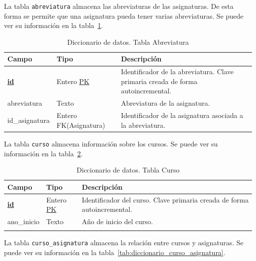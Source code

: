 La tabla \texttt{abreviatura} almacena las abreviaturas de las asignaturas. 
De esta forma se permite que una asignatura pueda tener varias abreviaturas.
Se puede ver su información en la tabla~\ref{tab:diccionario_abreviatura}.

\begin{table}
  \centering 
  \begin{tabular}{l p{} p{}}
    \toprule
    \textbf{Campo} & \textbf{Tipo} & \textbf{Descripción}\\
    \midrule
    \textbf{\underline{id}} & Entero \underline{PK} & Identificador de la abreviatura. Clave primaria creada de forma autoincremental. \\ \addlinespace
    abreviatura & Texto & Abreviatura de la asignatura. \\ \addlinespace
    id\_asignatura & Entero FK(Asignatura) & Identificador de la asignatura asociada a la abreviatura. \\
    \bottomrule
  \end{tabular}
  \caption{Diccionario de datos. Tabla Abreviatura}
  \label{tab:diccionario_abreviatura}
\end{table}

La tabla \texttt{curso} almacena información sobre los cursos. Se puede ver su información en la tabla~\ref{tab:diccionario_curso}.

\begin{table}
  \centering 
  \begin{tabular}{l p{} p{}}
    \toprule
    \textbf{Campo} & \textbf{Tipo} & \textbf{Descripción}\\
    \midrule
    \textbf{\underline{id}} & Entero \underline{PK} & Identificador del curso. Clave primaria creada de forma autoincremental. \\ \addlinespace
    ano\_inicio & Texto & Año de inicio del curso. \\ \addlinespace
    \bottomrule
  \end{tabular}
  \caption{Diccionario de datos. Tabla Curso}
  \label{tab:diccionario_curso}
\end{table}

La tabla \texttt{curso\_asignatura} almacena la relación entre cursos y asignaturas. 
Se puede ver su información en la tabla~\ref{tab:diccionario_curso_asignatura}.

